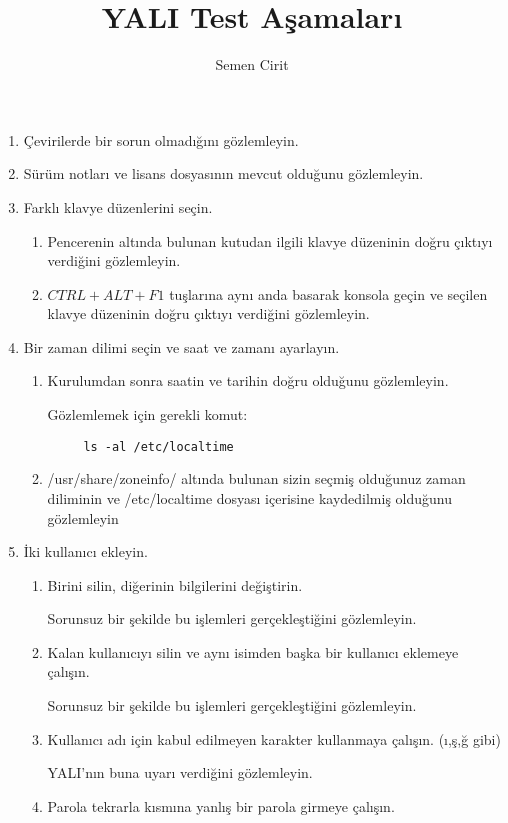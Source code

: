 \documentclass[a4paper,10pt]{article}
\title{YALI Test Aşamaları}
\author{Semen Cirit}
\begin{document}
\maketitle
\begin{enumerate}
\item Çevirilerde bir sorun olmadığını gözlemleyin.
\item Sürüm notları ve lisans dosyasının mevcut olduğunu gözlemleyin.
\item Farklı klavye düzenlerini seçin.
	\begin{enumerate}	
	\item Pencerenin altında bulunan kutudan ilgili klavye düzeninin doğru çıktıyı verdiğini gözlemleyin.

	\item $CTRL+ALT+F1$ tuşlarına aynı anda basarak konsola geçin ve seçilen klavye düzeninin doğru çıktıyı verdiğini gözlemleyin.
	\end{enumerate}
\item Bir zaman dilimi seçin ve saat ve zamanı ayarlayın.


    \begin{enumerate}
	\item Kurulumdan sonra saatin ve tarihin doğru olduğunu gözlemleyin.
	
	Gözlemlemek için gerekli komut:
	\begin{verbatim}
	 ls -al /etc/localtime
	\end{verbatim}

        \item /usr/share/zoneinfo/ altında bulunan sizin seçmiş olduğunuz zaman diliminin ve /etc/localtime dosyası içerisine kaydedilmiş olduğunu gözlemleyin
    \end{enumerate}
\item İki kullanıcı ekleyin.
\begin{enumerate}
	\item Birini silin, diğerinin bilgilerini değiştirin.

	Sorunsuz bir şekilde bu işlemleri gerçekleştiğini gözlemleyin.
	\item Kalan kullanıcıyı silin ve aynı isimden başka bir kullanıcı eklemeye çalışın.

	Sorunsuz bir şekilde bu işlemleri gerçekleştiğini gözlemleyin.
	\item Kullanıcı adı için kabul edilmeyen karakter kullanmaya çalışın. (ı,ş,ğ gibi)
	
	YALI'nın buna uyarı verdiğini gözlemleyin.
	\item Parola tekrarla kısmına yanlış bir parola girmeye çalışın.


\end{enumerate}
\end{enumerate}
\end{document}

